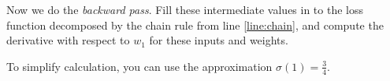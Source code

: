 \documentclass[11pt]{article}
\begin{document}
Now we do the \emph{backward pass}. Fill these intermediate values in to the loss function decomposed by the chain rule  from line \ref{line:chain}, and compute the derivative with respect to $w_1$ for these inputs and weights.

To simplify calculation, you can use the approximation $\sigma(1) = \frac{3}{4}$.

\end{document}
